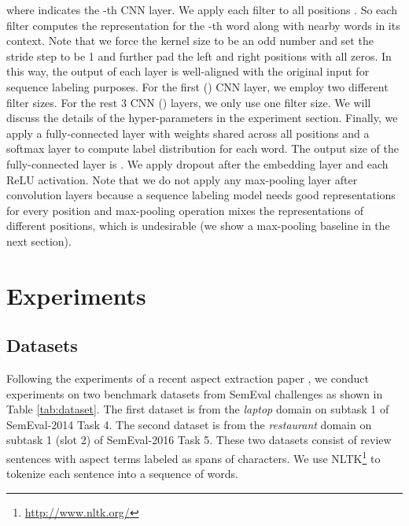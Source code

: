 \documentclass[11pt,a4paper]{article}
\begin{document}
where  indicates the -th CNN layer. 
We apply each filter to all positions .
So each filter computes the representation for the -th word along with  nearby words in its context.  
Note that we force the kernel size  to be an odd number and set the stride step to be 1 and further pad the left  and right  positions with all zeros.  
In this way, the output of each layer is well-aligned with the original input  for sequence labeling purposes.
For the first () CNN layer, we employ two different filter sizes. 
For the rest 3 CNN () layers, we only use one filter size.
We will discuss the details of the hyper-parameters in the experiment section.
Finally, we apply a fully-connected layer with weights shared across all positions and a softmax layer to compute label distribution for each word.
The output size of the fully-connected layer is .
We apply dropout after the embedding layer and each ReLU activation.
Note that we do not apply any max-pooling layer after convolution layers because a sequence labeling model needs good representations for every position and max-pooling operation mixes the representations of different positions, which is undesirable (we show a max-pooling baseline in the next section).

\section{Experiments}

\subsection{Datasets}
\begin{table}[t]
    \label{tab:dataset} 
    \centering
    \caption{Dataset description with the number of sentences(\#S.) and number of aspect terms(\#A.)}
\end{table}

Following the experiments of a recent aspect extraction paper \cite{li2017deep},
we conduct experiments on two benchmark datasets from SemEval challenges \cite{pontiki2014SemEval,pontiki2016semeval} as shown in Table \ref{tab:dataset}. 
The first dataset is from the \textit{laptop} domain on subtask 1 of SemEval-2014 Task 4.
The second dataset is from the \textit{restaurant} domain on subtask 1 (slot 2) of SemEval-2016 Task 5.
These two datasets consist of review sentences with aspect terms labeled as spans of characters.
We use NLTK\footnote{\url{http://www.nltk.org/} } to tokenize each sentence into a sequence of words. 
\end{document}
